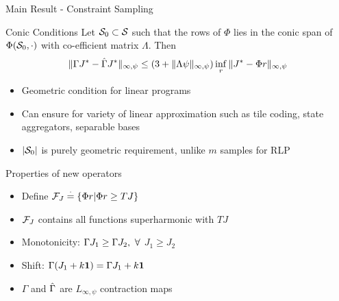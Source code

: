 \documentclass[10pt,handout]{beamer}
\begin{document}
\begin{frame}[fragile]{Main Result - Constraint Sampling}
\begin{block}{Conic Conditions}
Let $\S_0\subset \S$ such that the rows of $\Phi$ lies in the conic span of $\Phi(\S_0,\cdot)$ with co-efficient matrix $\Lambda$. Then
\begin{align*}
\norm{ \Gamma J^*-\hg J^* }_{\infty,\psi}\leq (3+\norm{\Lambda \psi}_{\infty,\psi})\inf_r\norm{J^*-\Phi r}_{
\infty,\psi}
\end{align*}
\end{block}
\begin{itemize}
\item Geometric condition for linear programs
\item Can ensure for variety of linear approximation such as tile coding, state aggregators, separable bases
\item $|\S_0|$ is purely geometric requirement, unlike $m$ samples for RLP
\end{itemize}
\end{frame}


\begin{frame}[fragile]{Properties of new operators}
\begin{itemize}
\item Define $\F_J\eqdef\{\Phi r | \Phi r\geq TJ \}$
\item $\F_J$ contains all functions superharmonic with $TJ$
\item {Monotonicity:} $\Gamma J_1\geq \Gamma J_2, \mb \forall$ $J_1\geq J_2$
\item {Shift:} $\Gamma (J_1+k\one)= \Gamma J_1+ k\one$
\item $\Gamma$ and $\hg$ are $L_{\infty,\psi}$ contraction maps
\end{itemize}

\end{frame}
\end{document}
